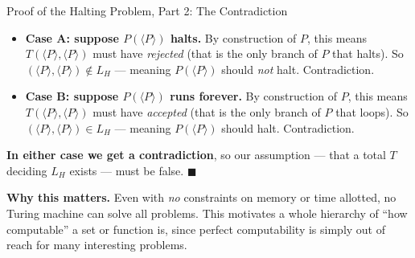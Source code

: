 \documentclass[aspectratio=169,10pt]{beamer}
\begin{document}
\begin{frame}{Proof of the Halting Problem, Part 2: The Contradiction}
  \begin{itemize}
    \item \textbf{Case A: suppose $P(\langle P \rangle)$ halts.} By
      construction of $P$, this means $T(\langle P \rangle, \langle P \rangle)$
      must have \emph{rejected} (that is the only branch of $P$ that halts).
      So $(\langle P \rangle, \langle P \rangle) \notin L_H$ --- meaning
      $P(\langle P \rangle)$ should \emph{not} halt. Contradiction.
    \item \textbf{Case B: suppose $P(\langle P \rangle)$ runs forever.} By
      construction of $P$, this means $T(\langle P \rangle, \langle P \rangle)$
      must have \emph{accepted} (that is the only branch of $P$ that loops).
      So $(\langle P \rangle, \langle P \rangle) \in L_H$ --- meaning
      $P(\langle P \rangle)$ should halt. Contradiction.
  \end{itemize}

  \vspace{3mm}
  \textbf{In either case we get a contradiction}, so our assumption --- that a
  total $T$ deciding $L_H$ exists --- must be false. \hfill $\blacksquare$

  \vspace{3mm}
  \textbf{Why this matters.} Even with \emph{no} constraints on memory or time
  allotted, no Turing machine can solve all problems. This motivates a whole
  hierarchy of ``how computable'' a set or function is, since perfect
  computability is simply out of reach for many interesting problems.
\end{frame}
\end{document}
